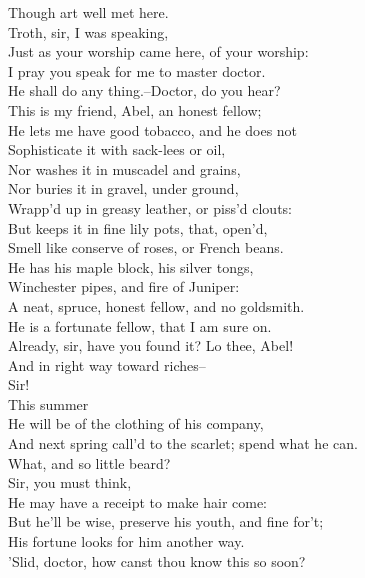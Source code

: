 \documentclass{memoir}
\begin{document}
\begin{drama*}
 Though art well met here.\\
\druggerspeaks {} Troth, sir, I was speaking,\\
 Just as your worship came here, of your worship:\\
 I pray you speak for me to master doctor.\\
\facespeaks  He shall do any thing.--Doctor, do you hear?\\
 This is my friend, Abel, an honest fellow;\\
 He lets me have good tobacco, and he does not\\
 Sophisticate it with sack-lees or oil,\\
 Nor washes it in muscadel and grains,\\
 Nor buries it in gravel, under ground,\\
 Wrapp'd up in greasy leather, or piss'd clouts:\\
 But keeps it in fine lily pots, that, open'd,\\
 Smell like conserve of roses, or French beans.\\
 He has his maple block, his silver tongs,\\
 Winchester pipes, and fire of Juniper:\\
 A neat, spruce, honest fellow, and no goldsmith.\\
\subtlespeaks  He is a fortunate fellow, that I am sure on.\\
\facespeaks  Already, sir, have you found it? Lo thee, Abel!\\
\subtlespeaks  And in right way toward riches--\\
\facespeaks {} Sir!\\
\subtlespeaks {} This summer\\
 He will be of the clothing of his company,\\
 And next spring call'd to the scarlet; spend what he can.\\
\facespeaks  What, and so little beard?\\
\subtlespeaks {} Sir, you must think,\\
 He may have a receipt to make hair come:\\
 But he'll be wise, preserve his youth, and fine for't;\\
 His fortune looks for him another way.\\
\facespeaks  'Slid, doctor, how canst thou know this so soon?\\

\end{drama*}
\end{document}
